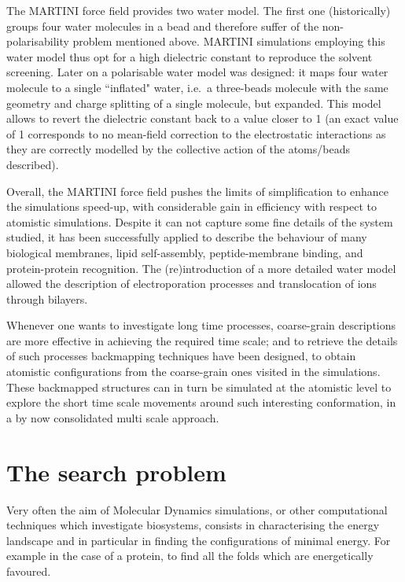 The MARTINI force field provides two water model. The first one (historically) groups four water molecules in a bead and therefore suffer of the non-polarisability problem mentioned above. MARTINI simulations employing this water model thus opt for a high dielectric constant to reproduce the solvent screening. Later on a polarisable water model was designed: it maps four water molecule to a single ``inflated" water, i.e.\ a three-beads molecule with the same geometry and charge splitting of a single molecule, but expanded. This model allows to revert the dielectric constant back to a value closer to 1 (an exact value of 1 corresponds to no mean-field correction to the electrostatic interactions as they are correctly modelled by the collective action of the atoms/beads described).

Overall, the MARTINI force field pushes the limits of simplification to enhance the simulations speed-up, with considerable gain in efficiency with respect to atomistic simulations. Despite it can not capture some fine details of the system studied, it has been successfully applied to describe the behaviour of many biological membranes, lipid self-assembly, peptide-membrane binding, and protein-protein recognition. The (re)introduction of a more detailed water model allowed the description of electroporation processes and translocation of ions through bilayers.

Whenever one wants to investigate long time processes, coarse-grain descriptions are more effective in achieving the required time scale; and to retrieve the details of such processes backmapping techniques have been designed, to obtain atomistic configurations from the coarse-grain ones visited in the simulations. These backmapped structures can in turn be simulated at the atomistic level to explore the short time scale movements around such interesting conformation, in a by now consolidated multi scale approach.


  
\section{The search problem} \label{sec:search}
Very often the aim of Molecular Dynamics simulations, or other computational techniques which investigate biosystems, consists in characterising the energy landscape and in particular in finding the configurations of minimal energy. For example in the case of a protein, to find all the folds which are energetically favoured.

